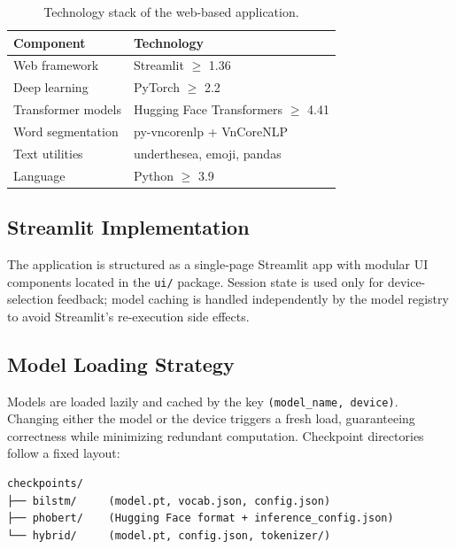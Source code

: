\documentclass[12pt]{report} %
\begin{document}
\begin{table}[htbp]
    \centering
    \caption{Technology stack of the web-based application.}
    \label{tab:tech-stack}
    \begin{tabular}{ll}
        \hline
        \textbf{Component} & \textbf{Technology}                                               \\
        \hline
        Web framework      & Streamlit $\geq$ 1.36 \cite{streamlit2024}                        \\
        Deep learning      & PyTorch $\geq$ 2.2 \cite{paszke2019pytorch}                       \\
        Transformer models & Hugging Face Transformers $\geq$ 4.41 \cite{wolf2020transformers} \\
        Word segmentation  & py-vncorenlp + VnCoreNLP \cite{vu2018vncorenlp}                   \\
        Text utilities     & underthesea, emoji, pandas                                        \\
        Language           & Python $\geq$ 3.9                                                 \\
        \hline
    \end{tabular}
\end{table}

\subsection{Streamlit Implementation}

The application is structured as a single-page Streamlit app with modular UI components located in the \texttt{ui/} package. Session state is used only for device-selection feedback; model caching is handled independently by the model registry to avoid Streamlit’s re-execution side effects.

\subsection{Model Loading Strategy}

Models are loaded lazily and cached by the key \texttt{(model\_name, device)}. Changing either the model or the device triggers a fresh load, guaranteeing correctness while minimizing redundant computation. Checkpoint directories follow a fixed layout:
\begin{verbatim}
checkpoints/
├── bilstm/     (model.pt, vocab.json, config.json)
├── phobert/    (Hugging Face format + inference_config.json)
└── hybrid/     (model.pt, config.json, tokenizer/)
\end{verbatim}
\end{document}
